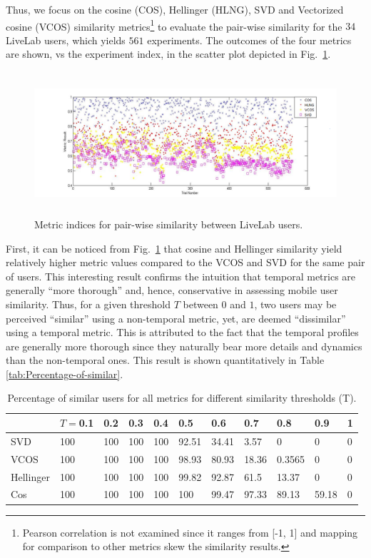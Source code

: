 \documentclass[12pt,epsf]{article}
\theoremstyle{definition}
\begin{document}
Thus, we focus on the cosine (COS), Hellinger (HLNG), SVD and Vectorized cosine (VCOS) 
similarity metrics\footnote{Pearson correlation is not examined since it ranges 
from [-1, 1] and mapping for comparison to other metrics skew the similarity results.} 
to evaluate the pair-wise similarity for the $34$ LiveLab users,
which yields $561$ experiments. The outcomes of the four metrics
are shown, vs the experiment index, in the scatter plot depicted
in Fig.~\ref{fig:scatter}.
%
\begin{figure}[!tp]
  \centering
\includegraphics[width=12cm,height=5.3cm]{scatter.png}
 \caption{Metric indices for pair-wise similarity between LiveLab users.}
 \label{fig:scatter}
\end{figure}
%
First, it can be noticed from Fig.~\ref{fig:scatter} that cosine
and Hellinger similarity yield relatively higher metric values compared
to the VCOS and SVD for the same pair of users. This interesting result
confirms the intuition that temporal metrics are generally ``more thorough'' and, hence,
conservative in assessing mobile user similarity. Thus,
for a given threshold $T$ between $0$ and $1$, two users may be perceived ``similar'' using a non-temporal metric, yet, are deemed ``dissimilar'' using
a temporal metric. This is attributed to the fact that the temporal
profiles are generally more thorough since they naturally bear more details and dynamics 
than the non-temporal ones. This result is shown quantitatively in Table \ref{tab:Percentage-of-similar}.
\begin{table}
\caption{Percentage of similar users for all metrics for different similarity thresholds (T).}\label{tab:Percentage-of-similar}

\centering{}{} \label{tab:NonAndTemporal-Maj} %
\begin{tabular}{|l|l|l|l|l|l|l|l|l|l|l|}
\hline 
 & $T=$0.1 & 0.2  & 0.3  & 0.4  & 0.5  & 0.6  & 0.7  & 0.8  & 0.9  & 1\tabularnewline
\hline 
SVD  & 100  & 100  & 100  & 100  & 92.51  & 34.41  & 3.57  & 0  & 0  & 0\tabularnewline
\hline 
VCOS & 100  & 100  & 100  & 100  & 98.93  & 80.93  & 18.36  & 0.3565  & 0  & 0\tabularnewline
\hline 
Hellinger & 100  & 100  & 100  & 100  & 99.82  & 92.87  & 61.5  & 13.37  & 0  & 0\tabularnewline
\hline 
Cos & 100  & 100  & 100  & 100  & 100  & 99.47  & 97.33  & 89.13  & 59.18  & 0\tabularnewline
\hline 
\end{tabular}
\end{table}
\end{document}
